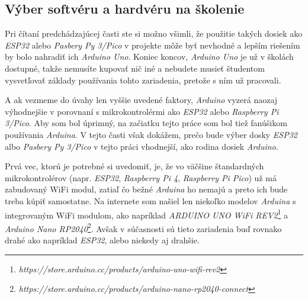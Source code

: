 
\subsection{Výber softvéru a hardvéru na školenie}
Pri čítaní predchádzajúcej časti ste si možno všimli, že použitie takých dosiek ako \textit{ESP32} alebo \textit{Pasbery Py 3/Pico} v projekte môže byť nevhodné a lepším riešením by bolo nahradiť ich \textit{Arduino Uno}. Koniec koncov, \textit{Arduino Uno} je už v školách dostupné, takže nemusíte kupovať nič iné a nebudete musieť študentom vysvetľovať základy používania tohto zariadenia, pretože s ním už pracovali.

A ak vezmeme do úvahy len vyššie uvedené faktory, \textit{Arduino} vyzerá naozaj výhodnejšie v porovnaní s mikrokontrolérmi ako \textit{ESP32} alebo \textit{Raspberry Pi 3/Pico}. Aby som bol úprimný, na začiatku tejto práce som bol tiež fanúšikom používania \textit{Arduina}. V tejto časti však dokážem, prečo bude výber dosky \textit{ESP32} albo \textit{Pasbery Py 3/Pico} v tejto práci vhodnejší, ako rodina dosiek \textit{Arduino}.

Prvá vec, ktorú je potrebné si uvedomiť, je, že vo väčšine štandardných mikrokontrolérov (napr. \textit{ESP32}, \textit{Raspberry Pi 4}, \textit{Raspberry Pi Pico}) už má zabudovaný WiFi modul, zatiaľ čo bežné \textit{Arduina} ho nemajú a preto ich bude treba kúpiť samostatne. Na internete som našiel len niekoľko modelov \textit{Arduina} s integrovaným WiFi modulom, ako napríklad \textit{ARDUINO UNO WiFi REV2}\footnote{\textit{https://store.arduino.cc/products/arduino-uno-wifi-rev2}} a \textit{Arduino Nano RP2040}\footnote{\textit{https://store.arduino.cc/products/arduino-nano-rp2040-connect}}. Avšak v súčasnosti sú tieto zariadenia buď rovnako drahé ako napríklad \textit{ESP32}, alebo niekedy aj drahšie.

